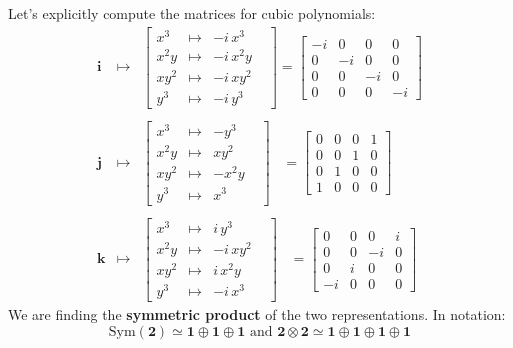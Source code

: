 \documentclass[12pt]{article}
\newcommand{\ii}{\mathbf{i}}
\newcommand{\jj}{\mathbf{j}}
\newcommand{\kk}{\mathbf{k}}
\begin{document}
\newpage  \noindent Let's explicitly compute the matrices for cubic polynomials:
\begin{eqnarray*} \ii &\mapsto& 
\left[\begin{array}{cccc}
x^3 &\mapsto&  -i\, x^3  \\
x^2y &\mapsto& -i\, x^2y \\ 
xy^2 &\mapsto& -i\, xy^2 \\
y^3 &\mapsto & -i\, y^3 & 
\end{array}\right] = \left[ \begin{array}{rr|rr} -i & 0 & 0 & 0\\ 
0 & -i & 0 & 0 \\ \hline 0 & 0 & -i & 0 \\
0 & 0 & 0 & -i \end{array}\right] \\ \\
\jj &\mapsto& 
\left[\begin{array}{cccc}
x^3 &\mapsto&   -y^3  \\
x^2y &\mapsto&  xy^2 \\ 
xy^2 &\mapsto&  -x^2y \\
y^3 &\mapsto &  x^3 & 
\end{array}\right]  \;\;\; = \left[ \begin{array}{rr|rr} 0 & 0 & 0 & 1 \\ 
0 & 0 & 1 & 0 \\ \hline
0 &  1 & 0 & 0 \\
1 & 0 & 0 & 0 \end{array}\right] \\ \\
\kk &\mapsto& 
\left[\begin{array}{cccc}
x^3 &\mapsto&   i\,y^3  \\
x^2y &\mapsto&  -i\,xy^2 \\
xy^2 &\mapsto&  i\,x^2y \\
y^3 &\mapsto &  -i\,x^3 & 
\end{array}\right]
\;\;\; = \left[ \begin{array}{rr|rr} 0 & 0 & 0 & i \\ 
0 & 0 & -i & 0 \\ \hline
0 &  i & 0 & 0 \\
-i & 0 & 0 & 0 \end{array}\right]
\end{eqnarray*} 
We are finding the \textbf{symmetric product} of the two representations.  In notation:
$$ \text{Sym}( \mathbf{2}) \simeq \mathbf{1} \oplus\mathbf{1} \oplus\mathbf{1}  \text{ and } \mathbf{2}\otimes\mathbf{2} \simeq \mathbf{1} \oplus \mathbf{1} \oplus \mathbf{1} \oplus \mathbf{1} $$
\end{document}
